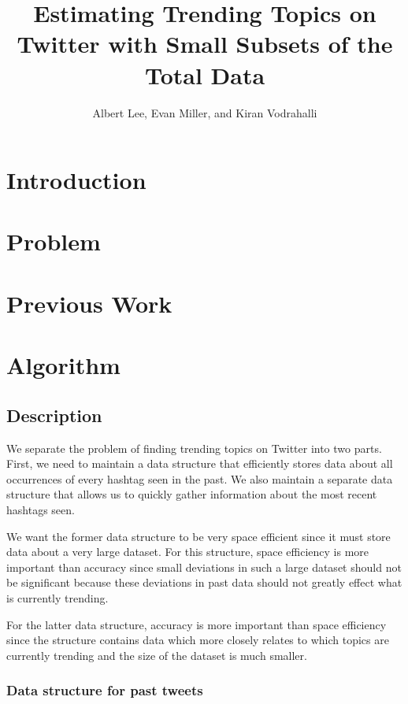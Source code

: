 \documentclass[a4paper,12pt]{article}
\begin{document}
\title{Estimating Trending Topics on Twitter with Small Subsets of the Total Data}

\author{Albert Lee, Evan Miller, and Kiran Vodrahalli}

\maketitle

\section{Introduction}

\section{Problem}

\section{Previous Work}

\section{Algorithm}

\subsection{Description}

We separate the problem of finding trending topics on Twitter into two parts.  First, we need to maintain a data structure that efficiently stores data about all occurrences of every hashtag seen in the past.  We also maintain a separate data structure that allows us to quickly gather information about the most recent hashtags seen.

We want the former data structure to be very space efficient since it must store data about a very large dataset.  For this structure, space efficiency is more important than accuracy since small deviations in such a large dataset should not be significant because these deviations in past data should not greatly effect what is currently trending.

For the latter data structure, accuracy is more important than space efficiency since the structure contains data which more closely relates to which topics are currently trending and the size of the dataset is much smaller.

\subsubsection{Data structure for past tweets}
\end{document}
